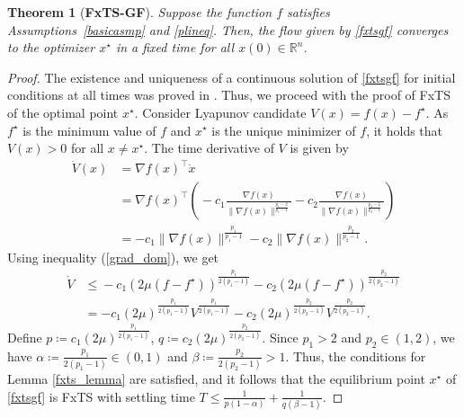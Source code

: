 \documentclass[letterpaper]{article}
\newtheorem{theorem}{Theorem}
\begin{document}
\begin{theorem}[\textbf{FxTS-GF}]\label{lemma:fxts_V}
Suppose the function $f$ satisfies Assumptions~\ref{basicasmp} and \ref{plineq}. Then, the flow given by \eqref{fxtsgf} converges to the optimizer $x^\star$ in a fixed time for all $x(0)\in \mathbb R^n$. 
\end{theorem}
\begin{proof}
The existence and uniqueness of a continuous solution of \eqref{fxtsgf} for initial conditions at all times was proved in \cite[Proposition 1]{kunal2021}. Thus, we proceed with the proof of FxTS of the optimal point $x^\star$. Consider Lyapunov candidate $V(x)=f(x)-f^\star$. As $f^\star$ is the minimum value of $f$ and $x^\star$ is the unique minimizer of $f$, it holds that $V(x)> 0$ for all $x\neq x^\star$. The time derivative of $V$ is given by 
\begin{align*}
\dot{V}(x)&=\nabla f(x)^\intercal  \dot{x} \\
&= \nabla f(x)^\intercal \left(\!-c_1\frac{\nabla f(x)}{\|\nabla f(x)\|^{\frac{p_1-2}{p_1-1}}} -c_2\frac{\nabla f(x)}{\|\nabla f(x)\|^{\frac{p_2-2}{p_2-1}}}\!\right) \\
&= -c_1 \|\nabla f(x)\|^{\frac{p_1}{p_1 -1}} -c_2 \|\nabla f(x)\|^{\frac{p_2}{p_2 -1}}.
\end{align*}
Using inequality (\ref{grad_dom}), we get 
\begin{align*}
\dot{V} &\leq \!-c_1(2\mu(f\!-\!f^\star))^{\frac{p_1}{2(p_1\!-\!1)}}\!-\!c_2(2\mu(f\!-\!f^\star))^{\frac{p_2}{2(p_2\!-\!1)}} \\
&= -c_1\!(2\mu)^{\frac{p_1}{2(p_1-1)}}V^{\frac{p_1}{2(p_1-1)}}\!-\!c_2(2\mu)^{\frac{p_2}{2(p_2-1)}} V^{\frac{p_2}{2(p_2-1)}}.
\end{align*}
Define $p\coloneqq c_1 (2\mu)^{\frac{p_1}{2(p_1-1)}}$, $q\coloneqq c_2 (2\mu)^{\frac{p_2}{2(p_2-1)}}$. Since $p_1>2$ and $p_2\in (1,2)$, we have $\alpha\coloneqq\frac{p_1}{2(p_1-1)} \in (0,1)$ and $\beta\coloneqq\frac{p_2}{2(p_2-1)} > 1$. Thus, the conditions for Lemma \ref{fxts_lemma} are satisfied, and it follows that the equilibrium point $x^\star$ of \eqref{fxtsgf} is FxTS with settling time $T\leq \frac{1}{p(1-\alpha)} + \frac{1}{q(\beta -1)}$.
\end{proof}
\end{document}

